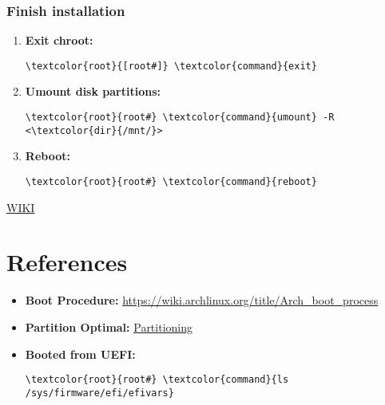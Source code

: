 \documentclass[10pt, a4paper, onecolumn, openany]{book} %
\begin{document}
\subsection{Finish installation}
\begin{enumerate}
    \item \textbf{Exit chroot:}
\begin{Verbatim}[commandchars=\\\{\}]
\textcolor{root}{[root#]} \textcolor{command}{exit}
\end{Verbatim}
    \item \textbf{Umount disk partitions:}
\begin{Verbatim}[commandchars=\\\{\}]
\textcolor{root}{root#} \textcolor{command}{umount} -R <\textcolor{dir}{/mnt/}>
\end{Verbatim}
    \item \textbf{Reboot:}
\begin{Verbatim}[commandchars=\\\{\}]
\textcolor{root}{root#} \textcolor{command}{reboot}
\end{Verbatim}
\end{enumerate}


\href{https://wiki.archlinux.org/title/Installation_guide#Installation}{WIKI}
\chapter{References}
\begin{itemize}
    \item \textbf{Boot Procedure:}
\newline \underline{\href{https://wiki.archlinux.org/title/Arch\_boot\_process}{https://wiki.archlinux.org/title/Arch\_boot\_process}}
    \item \textbf{Partition Optimal:}
\newline \underline{\href{https://rainbow.chard.org/2013/01/30/how-to-align-partitions-for-best-performance-using-parted/}{Partitioning}}
    \item \textbf{Booted from UEFI:}
\begin{Verbatim}[commandchars=\\\{\}]
\textcolor{root}{root#} \textcolor{command}{ls /sys/firmware/efi/efivars}
\end{Verbatim}
\end{itemize}
\end{document}
